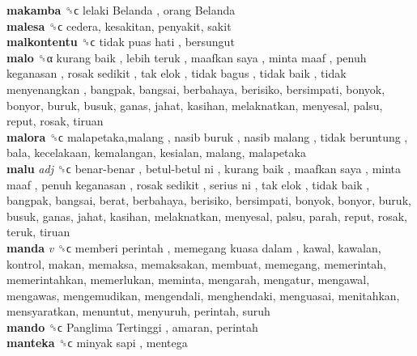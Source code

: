 \textbf{makamba} ␝ϲ   lelaki Belanda ,  orang Belanda   \\
\textbf{malesa} ␝ϲ  cedera, kesakitan, penyakit, sakit  \\
\textbf{malkontentu} ␝ϲ   tidak puas hati , bersungut  \\
\textbf{malo} ␝α   kurang baik ,  lebih teruk ,  maafkan saya ,  minta maaf ,  penuh keganasan ,  rosak sedikit ,  tak elok ,  tidak bagus ,  tidak baik ,  tidak menyenangkan , bangpak, bangsai, berbahaya, berisiko, bersimpati, bonyok, bonyor, buruk, busuk, ganas, jahat, kasihan, melaknatkan, menyesal, palsu, reput, rosak, tiruan  \\
\textbf{malora} ␝ϲ   malapetaka,malang ,  nasib buruk ,  nasib malang ,  tidak beruntung , bala, kecelakaan, kemalangan, kesialan, malang, malapetaka  \\
\textbf{malu} \emph{adj}  ␝ϲ   benar-benar ,  betul-betul ni ,  kurang baik ,  maafkan saya ,  minta maaf ,  penuh keganasan ,  rosak sedikit ,  serius ni ,  tak elok ,  tidak baik , bangpak, bangsai, berat, berbahaya, berisiko, bersimpati, bonyok, bonyor, buruk, busuk, ganas, jahat, kasihan, melaknatkan, menyesal, palsu, parah, reput, rosak, teruk, tiruan  \\
\textbf{manda} \emph{v}  ␝ϲ   memberi perintah ,  memegang kuasa dalam , kawal, kawalan, kontrol, makan, memaksa, memaksakan, membuat, memegang, memerintah, memerintahkan, memerlukan, meminta, mengarah, mengatur, mengawal, mengawas, mengemudikan, mengendali, menghendaki, menguasai, menitahkan, mensyaratkan, menuntut, menyuruh, perintah, suruh  \\
\textbf{mando} ␝ϲ   Panglima Tertinggi , amaran, perintah  \\
\textbf{manteka} ␝ϲ   minyak sapi , mentega  \\
